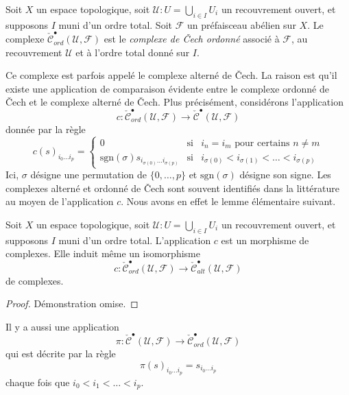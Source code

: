 \begin{definition}

\label{definition-ordered-cech-complex}
Soit $X$ un espace topologique, soit $\mathcal{U} : U = \bigcup_{i \in I} U_i$ un recouvrement ouvert, et supposons $I$ muni d'un ordre total. Soit $\mathcal{F}$ un préfaisceau abélien sur $X$. Le complexe $\check{\mathcal{C}}_{ord}^\bullet(\mathcal{U}, \mathcal{F})$ est le {\it complexe de {\v C}ech ordonné} associé à $\mathcal{F}$, au recouvrement $\mathcal{U}$ et à l'ordre total donné sur $I$.
\end{definition}

\noindent
Ce complexe est parfois appelé le complexe alterné de {\v C}ech. La raison est qu'il existe une application de comparaison évidente entre le complexe ordonné de {\v C}ech et le complexe alterné de {\v C}ech. Plus précisément, considérons l'application $$
c :
\check{\mathcal{C}}_{ord}^\bullet(\mathcal{U}, \mathcal{F})
\longrightarrow
\check{\mathcal{C}}^\bullet(\mathcal{U}, \mathcal{F})
$$ donnée par la règle $$
c(s)_{i_0\ldots i_p} =
\left\{
\begin{matrix}
0 &
\text{si} &
i_n = i_m \text{ pour certains } n \not = m\\
\text{sgn}(\sigma) s_{i_{\sigma(0)}\ldots i_{\sigma(p)}} &
\text{si} &
i_{\sigma(0)} < i_{\sigma(1)} < \ldots < i_{\sigma(p)}
\end{matrix}
\right.
$$ Ici, $\sigma$ désigne une permutation de $\{0, \ldots, p\}$ et $\text{sgn}(\sigma)$ désigne son signe. Les complexes alterné et ordonné de {\v C}ech sont souvent identifiés dans la littérature au moyen de l'application $c$. Nous avons en effet le lemme élémentaire suivant.

\begin{lemma}

\label{lemma-ordered-alternating}
Soit $X$ un espace topologique, soit $\mathcal{U} : U = \bigcup_{i \in I} U_i$ un recouvrement ouvert, et supposons $I$ muni d'un ordre total. L'application $c$ est un morphisme de complexes. Elle induit même un isomorphisme $$
c : \check{\mathcal{C}}_{ord}^\bullet(\mathcal{U}, \mathcal{F})
\to \check{\mathcal{C}}_{alt}^\bullet(\mathcal{U}, \mathcal{F})
$$ de complexes.
\end{lemma}

\begin{proof}
Démonstration omise.
\end{proof}

\noindent
Il y a aussi une application $$
\pi :
\check{\mathcal{C}}^\bullet(\mathcal{U}, \mathcal{F})
\longrightarrow
\check{\mathcal{C}}_{ord}^\bullet(\mathcal{U}, \mathcal{F})
$$ qui est décrite par la règle $$
\pi(s)_{i_0\ldots i_p} = s_{i_0\ldots i_p}
$$ chaque fois que $i_0 < i_1 < \ldots < i_p$.

